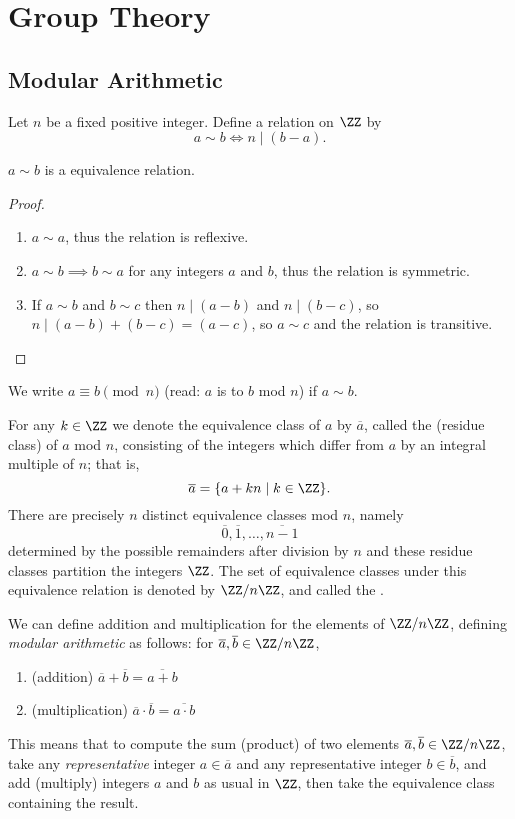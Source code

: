 \chapter{Group Theory}
\section{Modular Arithmetic}
Let $n$ be a fixed positive integer. Define a relation on $\ZZ$ by
\[a\sim b\iff n\mid(b-a).\]
\begin{proposition}
$a\sim b$ is a equivalence relation.
\end{proposition}
\begin{proof} \
\begin{enumerate}[label=(\arabic*)]
\item $a\sim a$, thus the relation is reflexive.
\item $a\sim b\implies b\sim a$ for any integers $a$ and $b$, thus the relation is symmetric.
\item If $a\sim b$ and $b\sim c$ then $n\mid(a-b)$ and $n\mid(b-c)$, so $n\mid(a-b)+(b-c)=(a-c)$, so $a\sim c$ and the relation is transitive.
\end{enumerate}
\end{proof}

We write $a\equiv b\pmod n$ (read: $a$ is  to $b$ mod $n$) if $a\sim b$.

For any $k\in\ZZ$ we denote the equivalence class of $a$ by $\overline{a}$, called the  (residue class) of $a$ mod $n$, consisting of the integers which differ from $a$ by an integral multiple of $n$; that is,
\[\overline{a}=\{a+kn\mid k\in\ZZ\}.\]
There are precisely $n$ distinct equivalence classes mod $n$, namely
\[\overline{0},\overline{1},\dots,\overline{n-1}\]
determined by the possible remainders after division by $n$ and these residue classes partition the integers $\ZZ$. The set of equivalence classes under this equivalence relation is denoted by $\ZZ/n\ZZ$, and called the .

We can define addition and multiplication for the elements of $\ZZ/n\ZZ$, defining \emph{modular arithmetic} as follows: for $\overline{a},\overline{b}\in\ZZ/n\ZZ$,
\begin{enumerate}
\item (addition) $\overline{a}+\overline{b}=\overline{a+b}$
\item (multiplication) $\overline{a}\cdot\overline{b}=\overline{a\cdot b}$
\end{enumerate}
This means that to compute the sum (product) of two elements $\overline{a},\overline{b}\in\ZZ/n\ZZ$, take any \emph{representative} integer $a\in\overline{a}$ and any representative integer $b\in\overline{b}$, and add (multiply) integers $a$ and $b$ as usual in $\ZZ$, then take the equivalence class containing the result.

